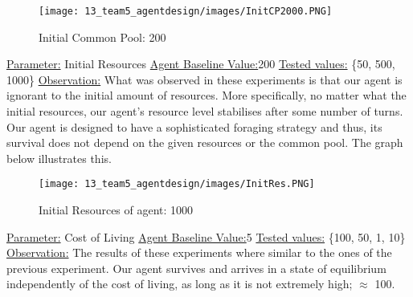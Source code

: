 \begin{figure}[!htb]
    \centering
    \texttt{[image: 13\_team5\_agentdesign/images/InitCP2000.PNG]}
    \caption{Initial Common Pool: 200}
    \label{Initial Common Pool: 200}
\end{figure}

\underline{Parameter:} Initial Resources \newline
\underline{Agent Baseline Value:}200 \newline
\underline{Tested values:} \{50, 500, 1000\} \newline
\underline{Observation:} \newline
What was observed in these experiments is that our agent is ignorant to the initial amount of resources. More specifically, no matter what the initial resources, our agent's resource level stabilises after some number of turns. Our agent is designed to have a sophisticated foraging strategy and thus, its survival does not depend on the given resources or the common pool. The graph below illustrates this.

\begin{figure}[!htb]
    \centering
    \texttt{[image: 13\_team5\_agentdesign/images/InitRes.PNG]}
    \caption{Initial Resources of agent: 1000}
\end{figure}


\underline{Parameter:} Cost of Living \newline
\underline{Agent Baseline Value:}5 \newline
\underline{Tested values:} \{100, 50, 1, 10\} \newline
\underline{Observation:} \newline
The results of these experiments where similar to the ones of the previous experiment. Our agent survives and arrives in a state of equilibrium independently of the cost of living, as long as it is not extremely high; $\approx$ 100.

